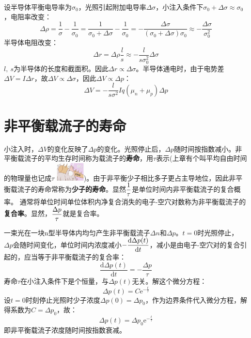设半导体平衡电导率为$\sigma_0$，光照引起附加电导率$\Delta \sigma$，小注入条件下$\sigma_0+\Delta \sigma\approx\sigma_0$，电阻率改变：
\begin{equation}
    \Delta\rho=\frac{1}{\sigma}-\frac{1}{\sigma_0}=\frac{1}{\sigma_0+\Delta\sigma}-\frac{1}{\sigma_0}=-\frac{\Delta\sigma}{(\sigma_0+\Delta\sigma)\sigma_0}\approx-\frac{\Delta\sigma}{\sigma_0^2}
\end{equation}
半导体电阻改变：
\begin{equation}
    \Delta r=\Delta\rho\frac{l}{s}\approx-\frac{l}{s\sigma_0^2}\Delta\sigma
\end{equation}
$l,\ s$为半导体的长度和截面积。因此$\Delta r\propto \Delta \sigma$。半导体通电时，由于电势差$\Delta V=I\Delta r$，故$\Delta V\propto\Delta\sigma$，因此$\Delta V\propto\Delta p$：
\begin{equation}
    \Delta V=-\frac{l}{s\sigma^2}Iq(\mu_n+\mu_p)\Delta p
\end{equation}

\section{非平衡载流子的寿命}

小注入时，$\Delta V$的变化反映了$\Delta p$的变化。光照停止后，$\Delta p$随时间按指数减小。非平衡载流子的平均生存时间称为载流子的\textbf{寿命}，用$\tau$表示(上章有个叫平均自由时间的物理量也记成$\tau$ \includegraphics[width=4em, align=c]{idiot.jpg})。由于非平衡少子相比多子更占主导地位，因此非平衡载流子的寿命常称为\textbf{少子的寿命}。显然$\displaystyle \frac{1}{\tau}$是单位时间内非平衡载流子的复合概率。\vspace{1ex}
通常将单位时间单位体积内净复合消失的电子-空穴对数称为非平衡载流子的\textbf{复合率}。显然，$\displaystyle \frac{\Delta p}{\tau}$就是复合率。

一束光在一块n型半导体内均匀产生非平衡载流子$\Delta n$和$\Delta p$。$t=0$时光照停止，\vspace{1ex}
$\Delta p$会随时间变化，单位时间内浓度减小$\displaystyle -\frac{\mathrm{d}\Delta p(t)}{\mathrm{d}t}$，减小是由电子-空穴对的复合引起的，应当等于非平衡载流子的复合率：
\begin{equation}
    \frac{\mathrm{d}\Delta p(t)}{\mathrm{d}t}=-\frac{\Delta p}{\tau}
\end{equation}
寿命$\tau$在小注入条件下是个恒量，与$\Delta p(t)$无关。解这个微分方程：
\begin{equation}
    \Delta p(t)=C\mathrm{e}^{-\frac{t}{\tau}}
\end{equation}
设$t=0$时刻停止光照时少子浓度$\Delta p(0)=\Delta p_0$，作为边界条件代入微分方程，解得系数为$C=\Delta p_0$，故：
\begin{equation}
    \Delta p(t)=\Delta p_0\mathrm{e}^{-\frac{t}{\tau}}
\end{equation}
即非平衡载流子浓度随时间按指数衰减。

